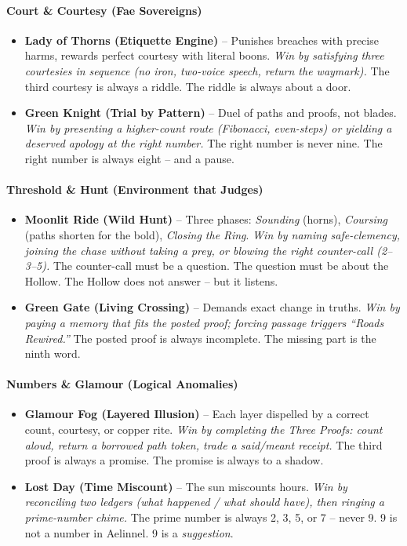 \paragraph{Court \& Courtesy (Fae Sovereigns)}
\begin{itemize}
\item \textbf{Lady of Thorns (Etiquette Engine)} -- Punishes breaches with precise harms, rewards perfect courtesy with literal boons. \emph{Win by satisfying three courtesies in sequence (no iron, two-voice speech, return the waymark).} The third courtesy is always a riddle. The riddle is always about a door.
\item \textbf{Green Knight (Trial by Pattern)} -- Duel of paths and proofs, not blades. \emph{Win by presenting a higher-count route (Fibonacci, even-steps) or yielding a deserved apology at the right number.} The right number is never nine. The right number is always eight -- and a pause.
\end{itemize}

\paragraph{Threshold \& Hunt (Environment that Judges)}
\begin{itemize}
\item \textbf{Moonlit Ride (Wild Hunt)} -- Three phases: \emph{Sounding} (horns), \emph{Coursing} (paths shorten for the bold), \emph{Closing the Ring}. \emph{Win by naming safe-clemency, joining the chase without taking a prey, or blowing the right counter-call (2--3--5).} The counter-call must be a question. The question must be about the Hollow. The Hollow does not answer -- but it listens.
\item \textbf{Green Gate (Living Crossing)} -- Demands exact change in truths. \emph{Win by paying a memory that fits the posted proof; forcing passage triggers ``Roads Rewired.''} The posted proof is always incomplete. The missing part is the ninth word.
\end{itemize}

\paragraph{Numbers \& Glamour (Logical Anomalies)}
\begin{itemize}
\item \textbf{Glamour Fog (Layered Illusion)} -- Each layer dispelled by a correct count, courtesy, or copper rite. \emph{Win by completing the \textit{Three Proofs}: count aloud, return a borrowed path token, trade a said/meant receipt.} The third proof is always a promise. The promise is always to a shadow.
\item \textbf{Lost Day (Time Miscount)} -- The sun miscounts hours. \emph{Win by reconciling two ledgers (what happened / what should have), then ringing a prime-number chime.} The prime number is always 2, 3, 5, or 7 -- never 9. 9 is not a number in Aelinnel. 9 is a \emph{suggestion}.
\end{itemize}


